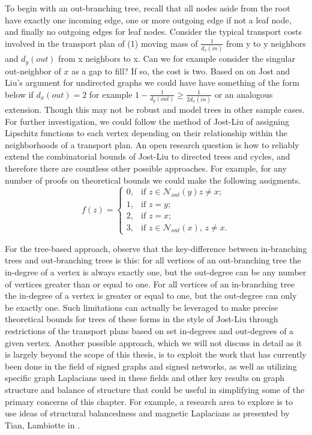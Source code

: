 \documentclass{Dissertate}
\theoremstyle{definition}
\theoremstyle{definition} %
\theoremstyle{definition}
\begin{document}
To begin with an out-branching tree, recall that all nodes aside from the root have exactly one incoming edge, one or more outgoing edge if not a leaf node, and finally no outgoing edges for leaf nodes. Consider the typical transport costs involved in the transport plan of (1) moving mass of $\frac{1}{d_x(in)}$ from y to y neighbors and $d_y(out)$ from x neighbors to x. Can we for example consider the singular out-neighbor of $x$ as a gap to fill? If so, the cost is two. 
Based on on Jost and Liu's argument for undirected graphs we could have have something of the form below if $d_x(out) = 2$ for example $1 - \frac{1}{d_y (out)} \geq \frac{1}{2d_x(in)}$
or an analogous extension. Though this may not be robust and model trees in other sample cases. For further investigation, we could follow the method of Jost-Liu of assigning Lipschitz functions to each vertex depending on their relationship within the neighborhoods of a transport plan. An open research question is how to reliably extend the combinatorial bounds of Jost-Liu to directed trees and cycles, and therefore there are countless other possible approaches. For example, for any number of proofs on theoretical bounds we could make the following assigments. 
\[
f(z) =
\begin{cases}
    0, & \text{if } z \in \mathcal{N}_{out}(y) z \neq x; \\
    1, & \text{if } z = y; \\
    2, & \text{if } z = x; \\
    3, & \text{if } z \in \mathcal{N}_{out}(x), \, z \neq x.
\end{cases}
\]

For the tree-based approach, observe that the key-difference between in-branching trees and out-branching trees is this: for all vertices of an out-branching tree the in-degree of a vertex is always exactly one, but the out-degree can be any number of vertices greater than or equal to one. For all vertices of an in-branching tree the in-degree of a vertex is greater or equal to one, but the out-degree can only be exactly one. Such limitations can actually be leveraged to make precise theoretical bounds for trees of these forms in the style of Jost-Liu through restrictions of the transport plans based on set in-degrees and out-degrees of a given vertex. 
Another possible approach, which we will not discuss in detail as it is largely beyond the scope of this thesis, is to exploit the work that has currently been done in the field of signed graphs and signed networks, as well as utilizing specific graph Laplacians used in these fields and other key results on graph structure and balance of structure that could be useful in simplifying some of the primary concerns of this chapter. For example, a research area to explore is to use ideas of structural balancedness and magnetic Laplacians as presented by Tian, Lambiotte in \cite{tian2024structural}.
\end{document}
